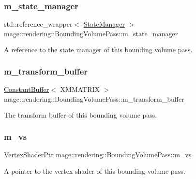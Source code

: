 \subsubsection{\texorpdfstring{m\+\_\+state\+\_\+manager}{m\_state\_manager}}
{\footnotesize\ttfamily std\+::reference\+\_\+wrapper$<$ \hyperlink{classmage_1_1rendering_1_1_state_manager}{State\+Manager} $>$ mage\+::rendering\+::\+Bounding\+Volume\+Pass\+::m\+\_\+state\+\_\+manager\hspace{0.3cm}{\ttfamily [private]}}

A reference to the state manager of this bounding volume pass. \hypertarget{classmage_1_1rendering_1_1_bounding_volume_pass_a814cde2a674f4c6e4052e5af740253b3}{}\label{classmage_1_1rendering_1_1_bounding_volume_pass_a814cde2a674f4c6e4052e5af740253b3} 
\subsubsection{\texorpdfstring{m\+\_\+transform\+\_\+buffer}{m\_transform\_buffer}}
{\footnotesize\ttfamily \hyperlink{classmage_1_1rendering_1_1_constant_buffer}{Constant\+Buffer}$<$ X\+M\+M\+A\+T\+R\+IX $>$ mage\+::rendering\+::\+Bounding\+Volume\+Pass\+::m\+\_\+transform\+\_\+buffer\hspace{0.3cm}{\ttfamily [private]}}

The transform buffer of this bounding volume pass. \hypertarget{classmage_1_1rendering_1_1_bounding_volume_pass_aed191e277603f097bcd55501339fd279}{}\label{classmage_1_1rendering_1_1_bounding_volume_pass_aed191e277603f097bcd55501339fd279} 
\subsubsection{\texorpdfstring{m\+\_\+vs}{m\_vs}}
{\footnotesize\ttfamily \hyperlink{namespacemage_1_1rendering_aaf704b9c54a4181f4950a1761de69dda}{Vertex\+Shader\+Ptr} mage\+::rendering\+::\+Bounding\+Volume\+Pass\+::m\+\_\+vs\hspace{0.3cm}{\ttfamily [private]}}

A pointer to the vertex shader of this bounding volume pass. 